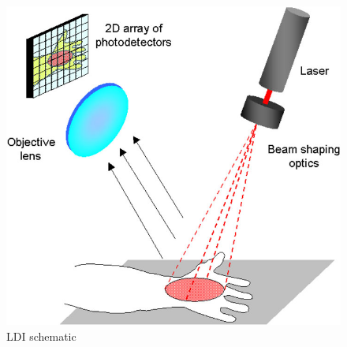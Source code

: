\documentclass[paper=letter, fontsize=11pt]{scrartcl}
\numberwithin{equation}{section}		%
\numberwithin{figure}{section}			%
\numberwithin{table}{section}			%
\begin{document}
\begin{figure}[H]
    \centering
    \begin{minipage}[t]{0.44\textwidth}
        \centering
        \includegraphics[scale=0.3]{LDI_schematic.jpg}
        \caption{LDI schematic}
    \end{minipage}
    \begin{minipage}[t]{0.44\textwidth}
        \centering

\end{minipage}
\end{figure}
\end{document}
